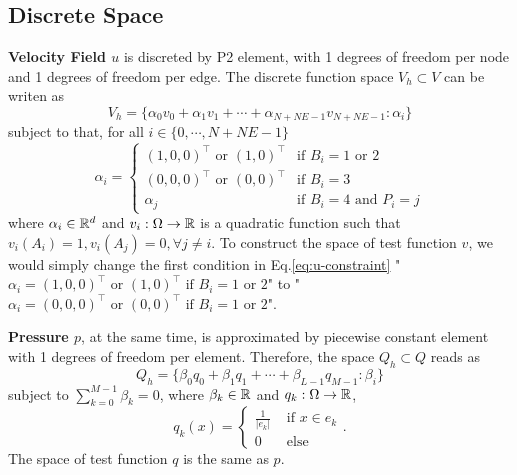 \subsection{Discrete Space}
\textbf{Velocity Field $u$} is discreted by P2 element, 
with 1 degrees of freedom per node and 1 degrees of freedom per edge.
The discrete function space $V_h\subset V$ can be writen as
\begin{equation}\label{eq:u-space}
  V_h=\{\alpha_0v_0+\alpha_1v_1+\cdots+\alpha_{N+NE-1}v_{N+NE-1}:\alpha_i\}
\end{equation}
subject to that, for all $i\in\{0,\cdots,N+NE-1\}$
\begin{equation}\label{eq:u-constraint}
  \alpha_i=\left\{
  \begin{array}{ll}
    (1,0,0)^\top \text{ or } (1,0)^\top & \text{if } B_i=1\text{ or }2 \\
    (0,0,0)^\top \text{ or } (0,0)^\top & \text{if } B_i=3 \\
    \alpha_j & \text{if } B_i=4 \text{ and } P_i=j
  \end{array}
  \right.
\end{equation}
where $\alpha_i\in\mathbb{R}^d$ and $v_i:\Omega\to\mathbb{R}$ is a 
quadratic function such that $v_i(A_i)=1,v_i(A_j)=0,\forall j\neq i$.
To construct the space of test function $v$, we would simply change the first condition in 
Eq.\eqref{eq:u-constraint} "$\alpha_i=(1,0,0)^\top \text{ or } (1,0)^\top \text{ if } B_i=1\text{ or }2$" to 
"$\alpha_i=(0,0,0)^\top \text{ or } (0,0)^\top \text{ if } B_i=1\text{ or }2$".

\textbf{Pressure $p$}, at the same time, is approximated by piecewise constant element 
with 1 degrees of freedom per element. Therefore, the space $Q_h\subset Q$ reads as
\begin{equation}\label{eq:p-space}
  Q_h=\{\beta_0q_0+\beta_1q_1+\cdots+\beta_{L-1}q_{M-1}:\beta_i\}
\end{equation}
subject to $\sum_{k=0}^{M-1}\beta_k=0$, where $\beta_k\in\mathbb{R}$ and $q_k:\Omega\to\mathbb{R}$,
\[
  q_k(x)=\left\{
    \begin{array}{ll}
      \frac1{|e_k|} & \text{ if } x\in e_k \\
                  0 & \text{ else}
    \end{array}
    \right..
  \]
The space of test function $q$ is the same as $p$.

